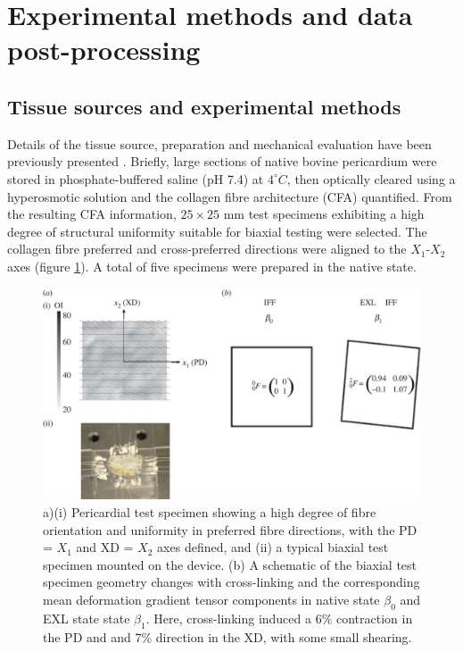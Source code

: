 \section{Experimental methods and data post-processing}

\subsection{Tissue sources and experimental methods} \label{c3:sec:21}

    Details of the tissue source, preparation and mechanical evaluation have been previously presented \cite{sun_biaxial_2003}. Briefly, large sections of native bovine pericardium were stored in phosphate-buffered saline (pH 7.4) at $4^\circ C$, then optically cleared using a hyperosmotic solution and the collagen fibre architecture (CFA) quantified. From the resulting CFA information, $25\times25$ mm test specimens exhibiting a high degree of structural uniformity suitable for biaxial testing were selected. The collagen fibre preferred and cross-preferred directions were aligned to the $X_1$-$X_2$ axes (figure \ref{c3:fig:3}). A total of five specimens were prepared in the native state.
    
\begin{figure}
\centering
\includegraphics[width=\textwidth]{Images/chapter3/F3large.jpg}
\caption{a)(i) Pericardial test specimen showing a high degree of fibre orientation and uniformity in preferred fibre directions, with the PD = $X_1$ and XD = $X_2$ axes defined, and (ii) a typical biaxial test specimen mounted on the device. (b) A schematic of the biaxial test specimen geometry changes with cross-linking and the corresponding mean deformation gradient tensor components in native state $\beta_0$ and EXL state state $\beta_1$. Here, cross-linking induced a 6\% contraction in the PD and and 7\% direction in the XD, with some small shearing.}
\label{c3:fig:3}
\end{figure}

